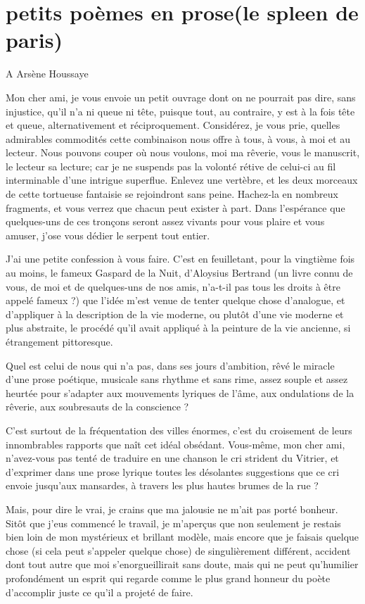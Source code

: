 \section[Petits poèmes en prose]{petits poèmes en prose\break (le spleen de paris)}

A Arsène Houssaye

Mon cher ami, je vous envoie un petit ouvrage dont on ne pourrait pas
dire, sans injustice, qu’il n’a ni
queue ni tête, puisque tout, au contraire, y est à la fois tête et
queue, alternativement et réciproquement. Considérez, je vous prie,
quelles admirables commodités cette combinaison nous offre à tous, à
vous, à moi et au lecteur. Nous pouvons couper où nous voulons, moi ma
rêverie, vous le manuscrit, le lecteur sa lecture; car je ne suspends
pas la volonté rétive de celui{}-ci au fil interminable
d’une intrigue superflue. Enlevez une vertèbre, et les
deux morceaux de cette tortueuse fantaisie se rejoindront sans peine.
Hachez{}-la en nombreux fragments, et vous verrez que chacun peut
exister à part. Dans l’espérance que quelques{}-uns de
ces tronçons seront assez vivants pour vous plaire et vous amuser,
j’ose vous dédier le serpent tout entier.

J’ai une petite confession à vous faire.
C’est en feuilletant, pour la vingtième fois au moins,
le fameux Gaspard de la Nuit, d’Aloysius Bertrand (un
livre connu de vous, de moi et de quelques{}-uns de nos amis,
n’a{}-t{}-il pas tous les droits à être appelé fameux
?) que l’idée m’est venue de tenter
quelque chose d’analogue, et
d’appliquer à la description de la vie moderne, ou
plutôt d’une vie moderne et plus abstraite, le procédé
qu’il avait appliqué à la peinture de la vie ancienne,
si étrangement pittoresque.

Quel est celui de nous qui n’a pas, dans ses jours
d’ambition, rêvé le miracle d’une
prose poétique, musicale sans rhythme et sans rime, assez souple et
assez heurtée pour s’adapter aux mouvements lyriques
de l’âme, aux ondulations de la rêverie, aux
soubresauts de la conscience ?

C’est surtout de la fréquentation des villes énormes,
c’est du croisement de leurs innombrables rapports que
naît cet idéal obsédant. Vous{}-même, mon cher ami,
n’avez{}-vous pas tenté de traduire en une chanson le
cri strident du Vitrier, et d’exprimer dans une prose
lyrique toutes les désolantes suggestions que ce cri envoie
jusqu’aux mansardes, à travers les plus hautes brumes
de la rue ?

Mais, pour dire le vrai, je crains que ma jalousie ne
m’ait pas porté bonheur. Sitôt que
j’eus commencé le travail, je
m’aperçus que non seulement je restais bien loin de
mon mystérieux et brillant modèle, mais encore que je faisais quelque
chose (si cela peut s’appeler quelque chose) de
singulièrement différent, accident dont tout autre que moi
s’enorgueillirait sans doute, mais qui ne peut
qu’humilier profondément un esprit qui regarde comme
le plus grand honneur du poète d’accomplir juste ce
qu’il a projeté de faire.

